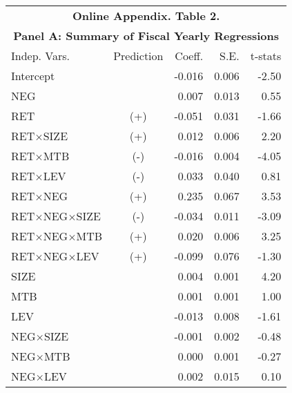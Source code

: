 \begin{table}[H] \label{oat2}
  \begin{center}
  	    \begin{tabular}{lcrrr}
  		\multicolumn{5}{c}{\textbf{Online Appendix. Table 2.}} \\
  		\multicolumn{5}{c}{\textbf{Panel A: Summary of Fiscal Yearly Regressions}} \\
  		\midrule
  		\midrule
  		Indep. Vars. & Prediction & Coeff. & S.E. & t-stats \\
  		\midrule
  		Intercept &   & -0.016 & 0.006 & -2.50 \\
  		NEG &   & 0.007 & 0.013 & 0.55 \\
  		RET & (+) & -0.051 & 0.031 & -1.66 \\
  		RET$\times$SIZE & (+) & 0.012 & 0.006 & 2.20 \\
  		RET$\times$MTB & (-) & -0.016 & 0.004 & -4.05 \\
  		RET$\times$LEV & (-) & 0.033 & 0.040 & 0.81 \\
  		RET$\times$NEG & (+) & 0.235 & 0.067 & 3.53 \\
  		RET$\times$NEG$\times$SIZE & (-) & -0.034 & 0.011 & -3.09 \\
  		RET$\times$NEG$\times$MTB & (+) & 0.020 & 0.006 & 3.25 \\
  		RET$\times$NEG$\times$LEV & (+) & -0.099 & 0.076 & -1.30 \\
  		SIZE &   & 0.004 & 0.001 & 4.20 \\
  		MTB &   & 0.001 & 0.001 & 1.00 \\
  		LEV &   & -0.013 & 0.008 & -1.61 \\
  		NEG$\times$SIZE &   & -0.001 & 0.002 & -0.48 \\
  		NEG$\times$MTB &   & 0.000 & 0.001 & -0.27 \\
  		NEG$\times$LEV &   & 0.002 & 0.015 & 0.10 \\
  		\bottomrule
  		\bottomrule
  	\end{tabular}%
  \end{center}
\end{table}%

